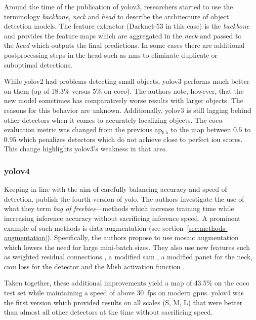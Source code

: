 \documentclass[draft,final]{vutinfth} %
\begin{document}
Around the time of the publication of \gls{yolo}v3, researchers
started to use the terminology \emph{backbone}, \emph{neck} and
\emph{head} to describe the architecture of object detection
models. The feature extractor (Darknet-53 in this case) is the
\emph{backbone} and provides the feature maps which are aggregated in
the \emph{neck} and passed to the \emph{head} which outputs the final
predictions. In some cases there are additional postprocessing steps
in the head such as \gls{nms} to eliminate duplicate or suboptimal
detections.

While \gls{yolo}v2 had problems detecting small objects, \gls{yolo}v3
performs much better on them (\gls{ap} of 18.3\% versus 5\% on
\gls{coco}). The authors note, however, that the new model sometimes
has comparatively worse results with larger objects. The reasons for
this behavior are unknown. Additionally, \gls{yolo}v3 is still lagging
behind other detectors when it comes to accurately localizing
objects. The \gls{coco} evaluation metric was changed from the
previous \gls{ap}$_{0.5}$ to the \gls{map} between $0.5$ to $0.95$
which penalizes detectors which do not achieve close to perfect
\gls{iou} scores. This change highlights \gls{yolo}v3's weakness in
that area.

\subsubsection{\gls{yolo}v4}
\label{sssec:yolov4}

Keeping in line with the aim of carefully balancing accuracy and speed
of detection, \textcite{bochkovskiy2020} publish the fourth version of
\gls{yolo}. The authors investigate the use of what they term
\emph{bag of freebies}---methods which increase training time while
increasing inference accuracy without sacrificing inference speed. A
prominent example of such methods is data augmentation (see
section~\ref{sec:methods-augmentation}). Specifically, the authors
propose to use mosaic augmentation which lowers the need for large
mini-batch sizes. They also use new features such as weighted residual
connections \cite{shen2016}, a modified \gls{sam} \cite{woo2018}, a
modified \gls{panet} \cite{liu2018} for the neck, \gls{ciou} loss
\cite{zheng2020} for the detector and the Mish activation function
\cite{misra2020}.

Taken together, these additional improvements yield a \gls{map} of
43.5\% on the \gls{coco} test set while maintaining a speed of above
\qty{30}{fps} on modern \glspl{gpu}. \gls{yolo}v4 was the first
version which provided results on all scales (S, M, L) that were
better than almost all other detectors at the time without sacrificing
speed.
\end{document}
